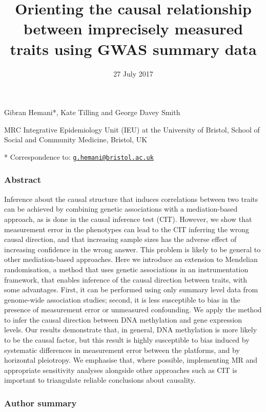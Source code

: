 \documentclass[]{article}
\title{Orienting the causal relationship between imprecisely measured traits
using GWAS summary data}
\author{}
\date{27 July 2017}
\begin{document}
\maketitle

Gibran Hemani*, Kate Tilling and George Davey Smith

MRC Integrative Epidemiology Unit (IEU) at the University of Bristol,
School of Social and Community Medicine, Bristol, UK

* Correspondence to:
\href{mailto:g.hemani@bristol.ac.uk}{\nolinkurl{g.hemani@bristol.ac.uk}}

\subsubsection{Abstract}\label{abstract}

Inference about the causal structure that induces correlations between
two traits can be achieved by combining genetic associations with a
mediation-based approach, as is done in the causal inference test (CIT).
However, we show that measurement error in the phenotypes can lead to
the CIT inferring the wrong causal direction, and that increasing sample
sizes has the adverse effect of increasing confidence in the wrong
answer. This problem is likely to be general to other mediation-based
approaches. Here we introduce an extension to Mendelian randomisation, a
method that uses genetic associations in an instrumentation framework,
that enables inference of the causal direction between traits, with some
advantages. First, it can be performed using only summary level data
from genome-wide association studies; second, it is less susceptible to
bias in the presence of measurement error or unmeasured confounding. We
apply the method to infer the causal direction between DNA methylation
and gene expression levels. Our results demonstrate that, in general,
DNA methylation is more likely to be the causal factor, but this result
is highly susceptible to bias induced by systematic differences in
measurement error between the platforms, and by horizontal pleiotropy.
We emphasise that, where possible, implementing MR and appropriate
sensitivity analyses alongside other approaches such as CIT is important
to triangulate reliable conclusions about causality.

\subsubsection{Author summary}\label{author-summary}
\end{document}
